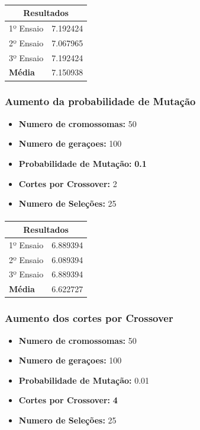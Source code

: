 \documentclass[a4paper]{article}
\begin{document}
\paragraph{}
\begin{center}
	\begin{tabular}{ |l|l| }
		\hline
		\multicolumn{2}{|c|}{Resultados} \\
		\hline
		1º Ensaio & 7.192424 \\
		2º Ensaio & 7.067965 \\
		3º Ensaio & 7.192424 \\
		\textbf{Média} & 7.150938 \\
		\hline
	\end{tabular}
\end{center}

\paragraph{}
\subsubsection{Aumento da probabilidade de Mutação}
\begin{itemize}
	\item \textbf{Numero de cromossomas:} 50
	\item \textbf{Numero de geraçoes:} 100
	\item \textbf{Probabilidade de Mutação:} \textbf{0.1}
	\item \textbf{Cortes por Crossover:} 2
	\item \textbf{Numero de Seleções:} 25
\end{itemize}
\paragraph{}
\begin{center}
	\begin{tabular}{ |l|l| }
		\hline
		\multicolumn{2}{|c|}{Resultados} \\
		\hline
		1º Ensaio & 6.889394 \\
		2º Ensaio & 6.089394 \\
		3º Ensaio & 6.889394 \\
		\textbf{Média} & 6.622727 \\
		\hline
	\end{tabular}
\end{center}

\newpage
\subsubsection{Aumento dos cortes por Crossover}
\begin{itemize}
	\item \textbf{Numero de cromossomas:} 50
	\item \textbf{Numero de geraçoes:} 100
	\item \textbf{Probabilidade de Mutação:} 0.01
	\item \textbf{Cortes por Crossover:} \textbf{4}
	\item \textbf{Numero de Seleções:} 25
\end{itemize}
\end{document}
